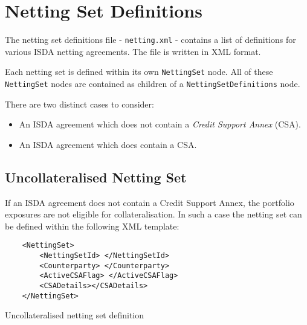 \section{Netting Set Definitions}\label{sec:nettingsetinput}

The netting set definitions file - {\tt netting.xml} - 
contains a list of
definitions for various ISDA netting agreements. The file is written
in XML format. 

\vspace{1em}

Each netting set is defined within its own \lstinline!NettingSet!
node. All of these \lstinline!NettingSet! nodes are contained as
children of a \lstinline!NettingSetDefinitions! node.

\vspace{1em}

There are two distinct cases to consider:

\begin{itemize}
\item An ISDA agreement which does not contain a \emph{Credit Support
    Annex} (CSA).
\item An ISDA agreement which does contain a CSA.
\end{itemize}
\subsection{Uncollateralised Netting Set}
If an ISDA agreement does not contain a Credit Support Annex, the
portfolio exposures are not eligible for collateralisation. In such a
case the netting set can be defined within the following XML template:

\begin{listing}[H]
\begin{verbatim}
    <NettingSet>
        <NettingSetId> </NettingSetId>
        <Counterparty> </Counterparty>
        <ActiveCSAFlag> </ActiveCSAFlag>
        <CSADetails></CSADetails>
    </NettingSet>
\end{verbatim}
\caption{Uncollateralised netting set definition}
\label{lst:nettingSetUncollat}
\end{listing}

